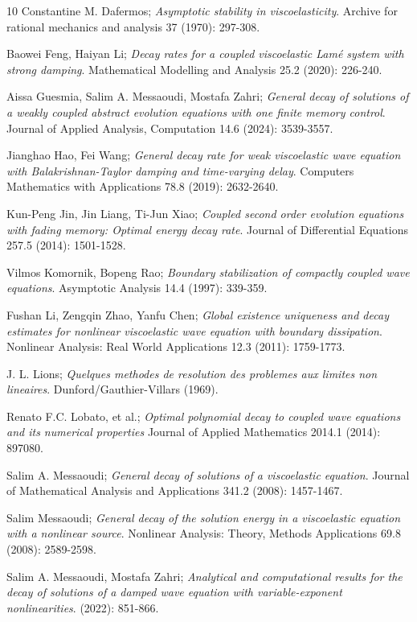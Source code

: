 \documentclass[reqno]{amsart}
\begin{document}
\begin{thebibliography}{10}
 Constantine M. Dafermos;
\emph{Asymptotic stability in viscoelasticity}.
Archive for rational mechanics and analysis 37 (1970): 297-308.

 Baowei Feng, Haiyan Li;
\emph{Decay rates for a coupled viscoelastic Lam\'e system with strong damping}.
Mathematical Modelling and Analysis 25.2 (2020): 226-240.

 Aissa Guesmia, Salim A. Messaoudi, Mostafa Zahri;
\emph{General decay of solutions of a weakly coupled abstract evolution equations 
with one finite memory control}.
 Journal of Applied Analysis, Computation 14.6 (2024): 3539-3557.
 
 Jianghao Hao,  Fei Wang;
\emph{General decay rate for weak viscoelastic wave equation with Balakrishnan-Taylor 
damping and time-varying delay}.
Computers Mathematics with Applications 78.8 (2019): 2632-2640.

 Kun-Peng Jin, Jin Liang,  Ti-Jun Xiao;
\emph{Coupled second order evolution equations with fading memory: Optimal energy
 decay rate}. Journal of Differential Equations 257.5 (2014): 1501-1528.
 
 Vilmos Komornik, Bopeng Rao;
\emph{Boundary stabilization of compactly coupled wave equations}.
 Asymptotic Analysis 14.4 (1997): 339-359.
 
 Fushan Li, Zengqin Zhao, Yanfu Chen;
\emph{Global existence uniqueness and decay estimates for nonlinear viscoelastic 
wave equation with boundary dissipation}.
 Nonlinear Analysis: Real World Applications 12.3 (2011): 1759-1773.
 
 J. L. Lions;
\emph{Quelques methodes de resolution des problemes aux limites non lineaires}.
 Dunford/Gauthier-Villars (1969).
 
 Renato F.C. Lobato, et al.;
\emph{Optimal polynomial decay to coupled wave equations and its numerical properties}
 Journal of Applied Mathematics 2014.1 (2014): 897080.
 
 Salim A. Messaoudi;
\emph{General decay of solutions of a viscoelastic equation}.
Journal of Mathematical Analysis and Applications 341.2 (2008): 1457-1467.

 Salim Messaoudi;
\emph{General decay of the solution energy in a viscoelastic equation with a nonlinear 
source}. Nonlinear Analysis: Theory, Methods Applications 69.8 (2008): 2589-2598.

 Salim A. Messaoudi, Mostafa Zahri;
\emph{Analytical and computational results for the decay of solutions of a damped 
wave equation with variable-exponent nonlinearities}. (2022): 851-866.


\end{thebibliography}
\end{document}
